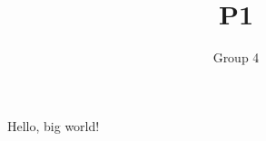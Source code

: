 \documentclass[11pt]{article}
\title{P1}
\author{Group 4}
\begin{document}
    \maketitle

    Hello, big world! \cite{how-to}

    
    
\end{document}
